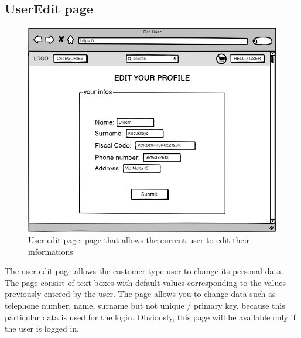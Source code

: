 \subsection{UserEdit page}
    \begin{figure}[H]
        \centering
        \includegraphics[width=\textwidth,height=0.7\textheight,keepaspectratio]{mockups/userEditPageMockup.png}
            \caption{User edit page: page that allows the current user to edit their informations}
            \label{fig:UserEdit}
    \end{figure}

The user edit page allows the customer type user to change its personal data. The page consist of text boxes with default values corresponding to the values previously entered by the user. The page allows you to change data such as telephone number, name, surname but not unique / primary key, because this particular data is used for the login.
Obviously, this page will be available only if the user is logged in.

    
